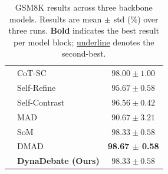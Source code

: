 \begin{table}[h]
{\begin{tabular}{llc}
 & CoT-SC           & $98.00 \pm 1.00$ \\
 & Self-Refine      & $95.67 \pm 0.58$ \\
 & Self-Contrast    & $96.56 \pm 0.42$ \\
 & MAD              & $90.67 \pm 3.21$ \\
 & SoM              & \underline{$98.33 \pm 0.58$} \\
 & DMAD             & \textbf{98.67 $\pm$ 0.58} \\
 & \textbf{DynaDebate (Ours)} & \underline{$98.33 \pm 0.58$} \\
\bottomrule
\end{tabular}
}
\caption{GSM8K results across three backbone models. Results are mean $\pm$ std (\%) over three runs. \textbf{Bold} indicates the best result per model block; \underline{underline} denotes the second-best.}
\label{tab:gsm8k_results}
\end{table}
